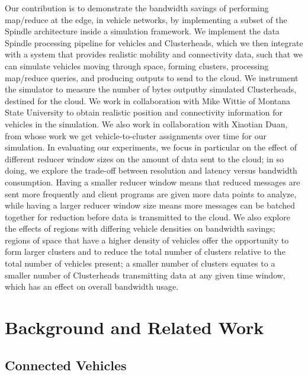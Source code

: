 \documentclass{thesis}
\begin{document}
    Our contribution is to demonstrate the bandwidth savings of performing map/reduce at the edge, in
    vehicle networks, by implementing a subset of the Spindle architecture inside a simulation framework.
    We implement the data Spindle processing pipeline for vehicles and Clusterheads, which we then integrate
    with a system that provides realistic mobility and connectivity data, such that we can simulate vehicles
    moving through space, forming clusters, processing map/reduce queries, and producing outputs to send to
    the cloud. We instrument the simulator to measure the number of bytes outputby simulated Clusterheads,
    destined for the cloud. We work in collaboration with Mike Wittie of Montana State University to obtain
    realistic position and connectivity information for vehicles in the simulation. We also work in
    collaboration with Xiaotian Duan, from whose work we get vehicle-to-cluster assignments over time
    for our simulation. In evaluating our experiments, we focus in particular on the effect of different
    reducer window sizes on the amount of data sent to the cloud; in so doing, we explore the trade-off
    between resolution and latency versus bandwidth consumption. Having a smaller reducer window means
    that reduced messages are sent more frequently and client programs are given more data points to
    analyze, while having a larger reducer window size means more messages can be batched together for
    reduction before data is transmitted to the cloud. We also explore the effects of regions with
    differing vehicle densities on bandwidth savings; regions of space that have a higher density
    of vehicles offer the opportunity to form larger clusters and to reduce the total number
    of clusters relative to the total number of vehicles present; a smaller number of clusters
    equates to a smaller number of Clusterheads transmitting data at any given time window, which
    has an effect on overall bandwidth usage.

\chapter{Background and Related Work}
    \section{Connected Vehicles}
\end{document}
